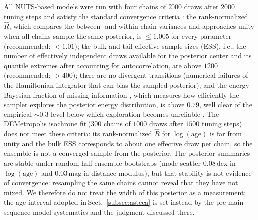 \documentclass{aa}
\begin{document}
All NUTS-based models were run with four chains of $2000$ draws after $2000$ tuning steps and satisfy the standard convergence criteria \citep{2021BayAn..16..667V}: the rank-normalized $\hat{R}$, which compares the between- and within-chain variances and approaches unity when all chains sample the same posterior, is $\leq1.005$ for every parameter (recommended: $<1.01$); the bulk and tail effective sample sizes (ESS), i.e., the number of effectively independent draws available for the posterior center and its quantile extremes after accounting for autocorrelation, are above $1200$ (recommended: $>400$); there are no divergent transitions (numerical failures of the Hamiltonian integrator that can bias the sampled posterior); and the energy Bayesian fraction of missing information \citep[E-BFMI;][]{2016arXiv160400695B}, which measures how efficiently the sampler explores the posterior energy distribution, is above $0.79$, well clear of the empirical ${\sim}0.3$ level below which exploration becomes unreliable \citep{2017arXiv170102434B}. The DEMetropolis isochrone fit ($300$ chains of $1000$ draws after $1500$ tuning steps) does not meet these criteria: its rank-normalized $\hat{R}$ for $\log(\mathrm{age})$ is far from unity and the bulk ESS corresponds to about one effective draw per chain, so the ensemble is not a converged sample from the posterior. The posterior summaries are stable under random half-ensemble bootstraps (mode scatter $0.08\,\mathrm{dex}$ in $\log(\mathrm{age})$ and $0.03\,\mathrm{mag}$ in distance modulus), but that stability is not evidence of convergence: resampling the same chains cannot reveal that they have not mixed. We therefore do not treat the width of this posterior as a measurement; the age interval adopted in Sect.~\ref{subsec:asteca} is set instead by the pre-main-sequence model systematics and the judgment discussed there.
\end{document}
